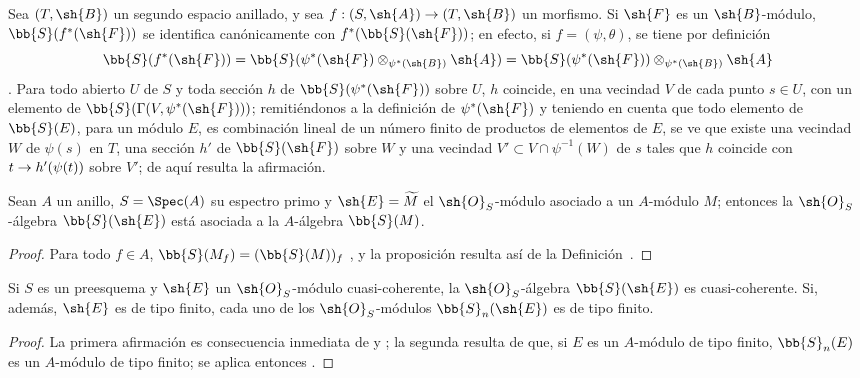 \documentclass[oneside,10pt]{amsart}
\makeatletter
\newcommand{\ega@arrow}[2]{\mathchoice{#1}{#2}{#2}{#2}}
\renewcommand{\to}{\ega@arrow{\longrightarrow}{\rightarrow}}
\let\EGAOriginalLabel\label
\renewcommand{\label}[1]{\phantomsection\EGAOriginalLabel{#1}}
\makeatother
\begin{document}
\begin{env}[1.7.5]
\label{II.1.7.5}
Sea $(T,\sh{B})$ un segundo espacio anillado, y sea $f:(S,\sh{A})\to(T,\sh{B})$ un morfismo.
Si $\sh{F}$ es un $\sh{B}$-módulo, $\bb{S}(f^*(\sh{F}))$ se identifica canónicamente con $f^*(\bb{S}(\sh{F}))$; en efecto, si $f=(\psi,\theta)$, se tiene por definición 
\[
  \bb{S}(f^*(\sh{F}))
  =\bb{S}(\psi^*(\sh{F})\otimes_{\psi^*(\sh{B})}\sh{A})
  =\bb{S}(\psi^*(\sh{F}))\otimes_{\psi^*(\sh{B})}\sh{A}
\]
.
Para todo abierto $U$ de $S$ y toda sección $h$ de $\bb{S}(\psi^*(\sh{F}))$ sobre $U$, $h$ coincide, en una vecindad $V$ de cada punto $s\in U$, con un elemento de $\bb{S}(\Gamma(V,\psi^*(\sh{F})))$; remitiéndonos a la definición de $\psi^*(\sh{F})$  y teniendo en cuenta que todo elemento de $\bb{S}(E)$, para un módulo $E$, es combinación lineal de un número finito de productos de elementos de $E$, se ve que existe una vecindad $W$ de $\psi(s)$ en $T$, una sección $h'$ de $\bb{S}(\sh{F})$ sobre $W$ y una vecindad $V'\subset V\cap\psi^{-1}(W)$ de $s$ tales que $h$ coincide con $t\to h'(\psi(t))$ sobre $V'$; de aquí resulta la afirmación.
\end{env}

\begin{proposition}[1.7.6]
\label{II.1.7.6}
Sean $A$ un anillo, $S=\Spec(A)$ su espectro primo y $\sh{E}=\widetilde{M}$ el $\sh{O}_S$-módulo asociado a un $A$-módulo $M$; entonces la $\sh{O}_S$-álgebra $\bb{S}(\sh{E})$ está asociada a la $A$-álgebra $\bb{S}(M)$.
\end{proposition}

\begin{proof}
Para todo $f\in A$, $\bb{S}(M_f)=(\bb{S}(M))_f$ , y la proposición resulta así de la Definición~.
\end{proof}

\begin{corollary}[1.7.7]
\label{II.1.7.7}
Si $S$ es un preesquema y $\sh{E}$ un $\sh{O}_S$-módulo cuasi-coherente, la $\sh{O}_S$-álgebra $\bb{S}(\sh{E})$ es cuasi-coherente.
Si, además, $\sh{E}$ es de tipo finito, cada uno de los $\sh{O}_S$-módulos $\bb{S}_n(\sh{E})$ es de tipo finito.
\end{corollary}

\begin{proof}
La primera afirmación es consecuencia inmediata de  y ; la segunda resulta de que, si $E$ es un $A$-módulo de tipo finito, $\bb{S}_n(E)$ es un $A$-módulo de tipo finito; se aplica entonces .
\end{proof}
\end{document}
